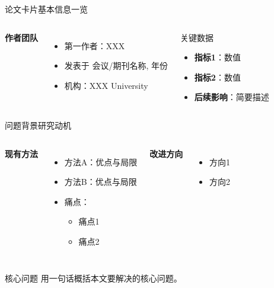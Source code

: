 

\begin{frame}{论文卡片}{基本信息一览}
  \begin{columns}[T, onlytextwidth]
      \textbf{\color{mustblue}作者团队}
      \begin{itemize}
        \item 第一作者：XXX
        \item 发表于 \alert{会议/期刊名称, 年份}
        \item 机构：XXX University
      \end{itemize}
      \begin{block}{关键数据}
        \begin{itemize}
          \item \textbf{指标1}：\alert{数值}
          \item \textbf{指标2}：数值
          \item \textbf{后续影响}：简要描述
        \end{itemize}
      \end{block}
  \end{columns}
\end{frame}

\begin{frame}{问题背景}{研究动机}
  \begin{columns}[T, onlytextwidth]
      \textbf{\color{mustblue}现有方法}
      \begin{itemize}
        \item 方法A：优点与局限
        \item 方法B：优点与局限
        \item \alert{痛点}：
          \begin{itemize}
            \item 痛点1
            \item 痛点2
          \end{itemize}
      \end{itemize}
      \textbf{\color{mustblue}改进方向}
      \begin{itemize}
        \item 方向1
        \item 方向2
      \end{itemize}
  \end{columns}

  \vspace{0.8em}
  \begin{alertblock}{核心问题}
    用一句话概括本文要解决的核心问题。
  \end{alertblock}
\end{frame}
